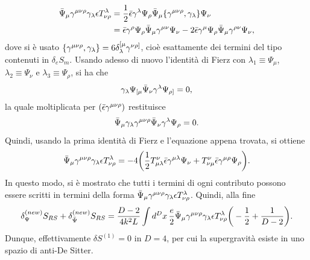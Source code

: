 \begin{equation}
    \begin{split}
        \bar{\Psi}_\mu\gamma^{\mu\nu\rho}\gamma_\lambda\epsilon T_{\nu\rho}^\lambda &= \frac{1}{2}\bar{\epsilon}\gamma^\lambda\Psi_\rho\bar{\Psi}_\mu\{\gamma^{\mu\nu\rho},\gamma_\lambda\}\Psi_\nu \\
        &= \bar{\epsilon}\gamma^\rho\Psi_\rho\bar{\Psi}_\mu\gamma^{\mu\nu}\Psi_\nu - 2\bar{\epsilon}\gamma^\mu\Psi_\rho\bar{\Psi}_\mu\gamma^{\rho\nu}\Psi_\nu,
    \end{split}
\end{equation}
dove si è usato $\{\gamma^{\mu\nu\rho},\gamma_\lambda\} = 6\delta_\lambda^{[\mu}\gamma^{\nu\rho]}$, cioè esattamente dei termini del tipo contenuti in $\delta_eS_m$. Usando adesso di nuovo l'identità di Fierz con $\lambda_1 \equiv \Psi_\mu$, $\lambda_2 \equiv \Psi_\nu$ e $\lambda_3 \equiv \Psi_\rho$, si ha che 
\begin{equation}
    \gamma_\lambda\Psi_{[\mu}\bar{\Psi}_\nu\gamma^\lambda\Psi_{\rho]} = 0,
\end{equation}
la quale moltiplicata per $(\bar{\epsilon}\gamma^{\mu\nu\rho})$ restituisce
\begin{equation}
    \bar{\Psi}_\mu\gamma_\lambda\gamma^{\mu\nu\rho}\bar{\Psi}_\nu\gamma^\lambda\Psi_\rho = 0.
\end{equation}
Quindi, usando la prima identità di Fierz e l'equazione appena trovata, si ottiene 
\begin{equation}
    \bar{\Psi}_\mu\gamma^{\mu\nu\rho}\gamma_\lambda\epsilon T^\lambda_{\nu\rho} = -4\bigg(\frac{1}{2}T_{\mu\lambda}^\nu\bar{\epsilon}\gamma^{\mu\lambda}\Psi_\nu + T_{\nu\mu}^\nu\bar{\epsilon}\gamma^{\mu\rho}\Psi_\rho\bigg).
\end{equation}
In questo modo, si è mostrato che tutti i termini di ogni contributo possono essere scritti in termini della forma $\bar{\Psi}_\mu\gamma^{\mu\nu\rho}\gamma_\lambda\epsilon T^\lambda_{\nu\rho}$. Quindi, alla fine 
\begin{equation}
    \delta_{\Psi}^{(new)}S_{RS} + \delta_{\bar{\Psi}}^{(new)}S_{RS} = \frac{D - 2}{4k^2L}\int d^Dx\,\frac{e}{2}\bar{\Psi}_\mu\gamma^{\mu\nu\rho}\gamma_\lambda\epsilon T^\lambda_{\nu\rho}\bigg(-\frac{1}{2} + \frac{1}{D - 2}\bigg).
\end{equation}
Dunque, effettivamente $\delta S^{(1)} = 0$ in $D = 4$, per cui la supergravità esiste in uno spazio di anti-De Sitter.

